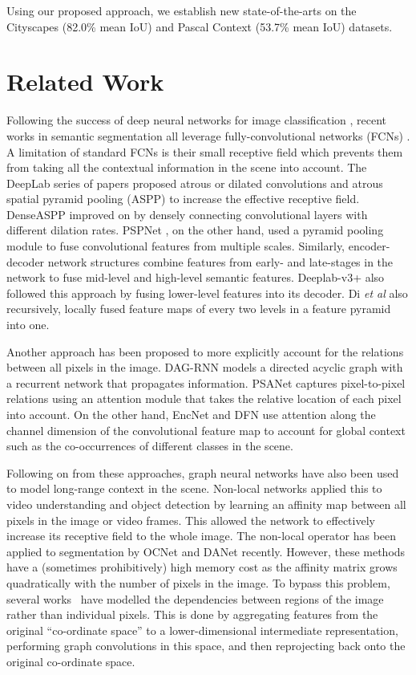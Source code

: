 \documentclass{bmvc2k}
\def\etal{\emph{et al}\bmvaOneDot}
\begin{document}
Using our proposed approach, we establish new state-of-the-arts on the Cityscapes \cite{Cityscapes} (82.0\% mean IoU) and Pascal Context \cite{mottaghi_cvpr14} (53.7\% mean IoU) datasets. \section{Related Work}

Following the success of deep neural networks for image classification \cite{alexnet,vgg,resnet},
recent works in semantic segmentation all leverage fully-convolutional networks (FCNs) \cite{fcn}.
A limitation of standard FCNs is their small receptive field which prevents them from taking all the contextual information in the scene into account.
The DeepLab series of papers \cite{deeplabv1, deeplabv2, deeplabv3} proposed atrous or dilated convolutions and atrous spatial pyramid pooling (ASPP) to increase the effective receptive field.
DenseASPP improved on \cite{deeplabv2} by densely connecting convolutional layers with different dilation rates.
PSPNet \cite{pspnet}, on the other hand, used a pyramid pooling module to fuse convolutional features from multiple scales.
Similarly, encoder-decoder network structures \cite{deconvnet,unet,fpn} combine features from early- and late-stages in the network to fuse mid-level and high-level semantic features.
Deeplab-v3+ \cite{deeplabv3p} also followed this approach by fusing lower-level features into its decoder.
Di \etal \cite{msci} also recursively, locally fused feature maps of every two levels in a feature pyramid into one.

Another approach has been proposed to more explicitly account for the relations between all pixels in the image.
DAG-RNN \cite{dagseg} models a directed acyclic graph with a recurrent network that propagates information.
PSANet \cite{psanet} captures pixel-to-pixel relations using an attention module that takes the relative location of each pixel into account.
On the other hand, EncNet \cite{encodingnet} and DFN \cite{dfn} use attention along the channel dimension of the convolutional feature map to account for global context such as the co-occurrences of different classes in the scene.

Following on from these approaches, graph neural networks \cite{gcnpaper} have also been used to model long-range context in the scene.
Non-local networks \cite{Nonlocal} applied this to video understanding and object detection by learning an affinity map between all pixels in the image or video frames.
This allowed the network to effectively increase its receptive field to the whole image.
The non-local operator has been applied to segmentation by OCNet \cite{ocnet} and DANet \cite{DAnet} recently.
However, these methods have a (sometimes prohibitively) high memory cost as the affinity matrix grows quadratically with the number of pixels in the image.
To bypass this problem, several works~\cite{graph_reason,SGR_gcn,beyond_grids} have modelled the dependencies between regions of the image rather than individual pixels.
This is done by aggregating features from the original ``co-ordinate space'' to a lower-dimensional intermediate representation, performing graph convolutions in this space, and then reprojecting back onto the original co-ordinate space.
\end{document}
